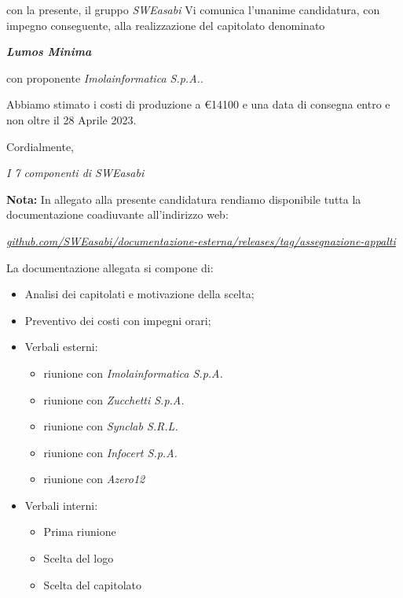 \documentclass{article}
\begin{document}
con la presente, il gruppo \textit{SWEasabi} Vi comunica l'unanime candidatura, con impegno conseguente, alla realizzazione del capitolato denominato

\begin{center}
    \textbf{\textit{Lumos Minima}}
\end{center}

con proponente \textit{Imolainformatica S.p.A.}.

Abbiamo stimato i costi di produzione a €14100 e una data di consegna entro e non oltre il 28 Aprile 2023.

Cordialmente,

\begin{flushright}
\textit{I 7 componenti di SWEasabi}
\end{flushright}

\textbf{Nota:} In allegato alla presente candidatura rendiamo disponibile tutta la documentazione coadiuvante all'indirizzo web:

\begin{center}
    \href{https://github.com/SWEasabi/documentazione-esterna/releases/tag/assegnazione-appalti}{\textit{github.com/SWEasabi/documentazione-esterna/releases/tag/assegnazione-appalti}}
\end{center}

La documentazione allegata si compone di:
\begin{itemize}
    \item Analisi dei capitolati e motivazione della scelta;
    \item Preventivo dei costi con impegni orari;
    \item Verbali esterni:
    \begin{itemize}
        \item riunione con \textit{Imolainformatica S.p.A.}
        \item riunione con \textit{Zucchetti S.p.A.}
        \item riunione con \textit{Synclab S.R.L.}
        \item riunione con \textit{Infocert S.p.A.}
        \item riunione con \textit{Azero12}
    \end{itemize}
    \item Verbali interni:
    \begin{itemize}
        \item Prima riunione
        \item Scelta del logo
        \item Scelta del capitolato
    \end{itemize}
\end{itemize}
\end{document}
